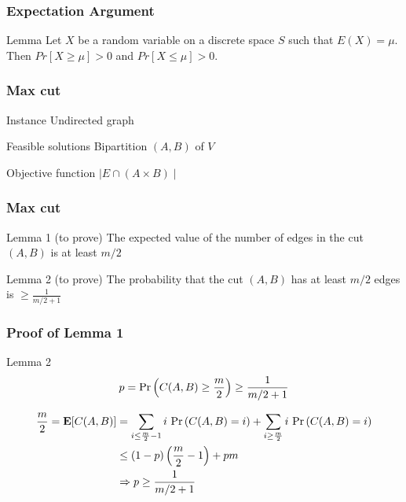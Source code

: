 




\begin{frame}[fragile]
	\frametitle{Expectation Argument}
	\begin{block}{Lemma}
		Let \(X\) be a random variable on a discrete space \(S\) such that \(E(X)=\mu\).
		Then \(Pr[X\ge \mu] > 0\) and \(Pr[X\le \mu] > 0\).
	\end{block}
\end{frame}

\begin{frame}[fragile]
	\frametitle{Max cut}
	\begin{block}{Instance}
		Undirected graph \g
	\end{block}
	\begin{block}{Feasible solutions}
		Bipartition $(A,B)$ of $V$
	\end{block}
	\begin{block}{Objective function}
		$\mid E \cap (A\times B)\mid$
	\end{block}
\end{frame}


\begin{frame}[fragile]
	\frametitle{Max cut}
	\begin{algorithm}[H]
	\end{algorithm}

	\begin{block}{Lemma 1 (to prove)}
		The expected value of the number of edges in the cut \((A,B)\) is at least \(m/2\)
	\end{block}
	\begin{block}{Lemma 2 (to prove)}
		The probability that the cut \((A,B)\) has at least \(m/2\) edges
		is  \(\ge \frac{1}{m/2 + 1}\)
	\end{block}
\end{frame}

\begin{frame}[fragile]
	\frametitle{Proof of Lemma 1}


	\begin{block}{Lemma 2}
		\begin{equation}\label{eq:p-cut}
			p = \text{Pr}\left(C(A,B) \ge \frac{m}{2} \right) \ge \frac{1}{m/2 + 1}\notag
		\end{equation}
	\end{block}

	\begin{align}
		\frac{m}{2} = \textbf{E}[C(A,B)] & = \sum_{i\le \frac{m}{2}-1} i\ \text{Pr}\left(C(A,B) = i\right) +  \sum_{i\ge \frac{m}{2}} i\ \text{Pr}\left(C(A,B) = i\right) \notag \\
		                                 & \le \left(1-p\right)\left(\frac{m}{2} - 1 \right) + pm \notag                                                                         \\
		                                 & \Rightarrow p \ge \frac{1}{m/2+1} \notag
	\end{align}
\end{frame}


